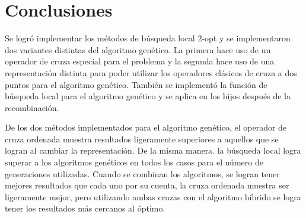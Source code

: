 \section*{Conclusiones}
Se logró implementar los métodos de búsqueda local $2$-opt y se implementaron dos variantes distintas del algoritmo genético. La primera hace uso de un operador de cruza especial para el problema y la segunda hace uso de una representación distinta para poder utilizar los operadores clásicos de cruza a dos puntos para el algoritmo genético. También se implementó la función de búsqueda local para el algoritmo genético y se aplica en los hijos después de la recombinación. \par De los dos métodos implementados para el algoritmo genético, el operador de cruza ordenada muestra resultados ligeramente superiores a aquellos que se logran al cambiar la representación. De la misma manera. la búsqueda local logra superar a los algoritmos genéticos en todos los casos para el número de generaciones utilizadas. Cuando se combinan los algoritmos, se logran tener mejores resultados que cada uno por su cuenta, la cruza ordenada muestra ser ligeramente mejor, pero utilizando ambas cruzas con el algoritmo híbrido se logra tener los resultados más cercanos al óptimo.
